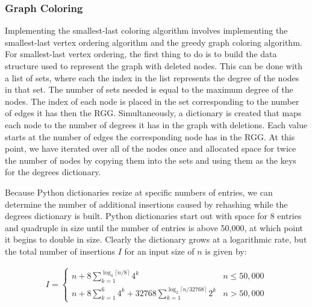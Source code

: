 \documentclass{article}
\begin{document}
        \subsubsection{Graph Coloring}
        Implementing the smallest-last coloring algorithm involves implementing the smallest-last vertex ordering algorithm and the greedy graph coloring algorithm. For smallest-last vertex ordering, the first thing to do is to build the data structure used to represent the graph with deleted nodes. This can be done with a list of sets, where each the index in the list represents the degree of the nodes in that set. The number of sets needed is equal to the maximum degree of the nodes. The index of each node is placed in the set corresponding to the number of edges it has then the RGG. Simultaneously, a dictionary is created that maps each node to the number of degrees it has in the graph with deletions. Each value starts at the number of edges the corresponding node has in the RGG. At this point, we have iterated over all of the nodes once and allocated space for twice the number of nodes by copying them into the sets and using them as the keys for the degrees dictionary.
        \par
        Because Python dictionaries resize at specific numbers of entries, we can determine the number of additional insertions caused by rehashing while the degrees dictionary is built. Python dictionaries start out with space for 8 entries and quadruple in size until the number of entries is above 50,000, at which point it begins to double in size. Clearly the dictionary grows at a logarithmic rate, but the total number of insertions $I$ for an input size of $n$ is given by:

        \begin{align}
            I =
            \begin{cases}
                n + 8\sum_{k=1}^{\log_4\lceil n/8\rceil}4^k & n \leq 50,000 \\
                n + 8\sum_{k=1}^{6}4^k + 32768\sum_{k=1}^{\log_2\lceil n/32768\rceil}2^k & n > 50,000
            \end{cases}
        \end{align}
\end{document}
